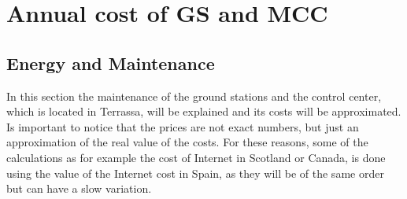 \section{Annual cost of GS and MCC}
\subsection{Energy and Maintenance}
In this section the maintenance of the ground stations and the control center, which is located in Terrassa, will be explained and its costs will be approximated. Is important to notice that the prices are not exact numbers, but just an approximation of the real value of the costs. For these reasons, some of the calculations as for example the cost of Internet in Scotland or Canada, is done using the value of the Internet cost in Spain, as they will be of the same order but can have a slow variation.

